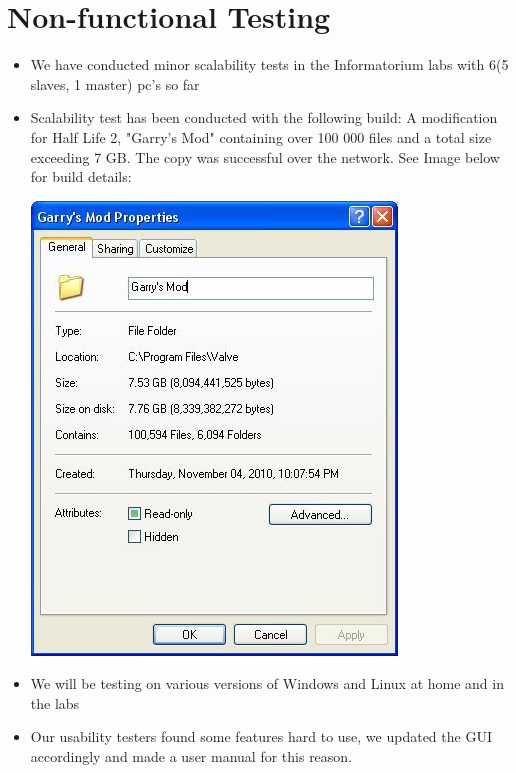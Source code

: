 \documentclass[a4paper,12pt,final]{article}
\begin{document}
\newpage
\section{Non-functional Testing}
\begin{itemize}
\item We have conducted minor scalability tests in the Informatorium labs with 6(5 slaves, 1 master) pc's so far
\item Scalability test has been conducted with the following build: A modification for Half Life 2, "Garry's Mod" containing over 100 000 files and a total size exceeding 7 GB. The copy was successful over the network. See Image below for build details:
\begin{center}
  	\includegraphics[scale=1]{scalability.jpg} 
  \end{center}
\item We will be testing on various versions of Windows and Linux at home and in the labs
\item Our usability testers found some features hard to use, we updated the GUI accordingly and made a user manual for this reason.
\end{itemize}
\end{document}
